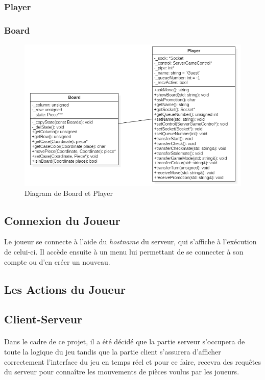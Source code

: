 \documentclass[10pt, a4paper]{article}
\begin{document}
\subsubsection{Player}

\subsubsection{Board}
\begin{figure} [H]
\centering
\includegraphics[scale=0.50]{board_player_diagram.png}
\caption{Diagram de Board et Player}
\end{figure}

\newpage

\subsection{Connexion du Joueur}
Le joueur se connecte à l'aide du \textit{hostname} du serveur, qui s'affiche à l'exécution de celui-ci. Il accède ensuite à un menu lui permettant de se connecter à son compte ou d'en créer un nouveau.

\subsection{Les Actions du Joueur}

\subsection{Client-Serveur}
\paragraph{}Dans le cadre de ce projet, il a été décidé que la partie serveur s'occupera de toute la logique du jeu tandis que la partie client s'assurera d'afficher correctement l'interface du jeu en temps réel et pour ce faire, recevra des requêtes du serveur pour connaître les mouvements de pièces voulus par les joueurs.
\end{document}
